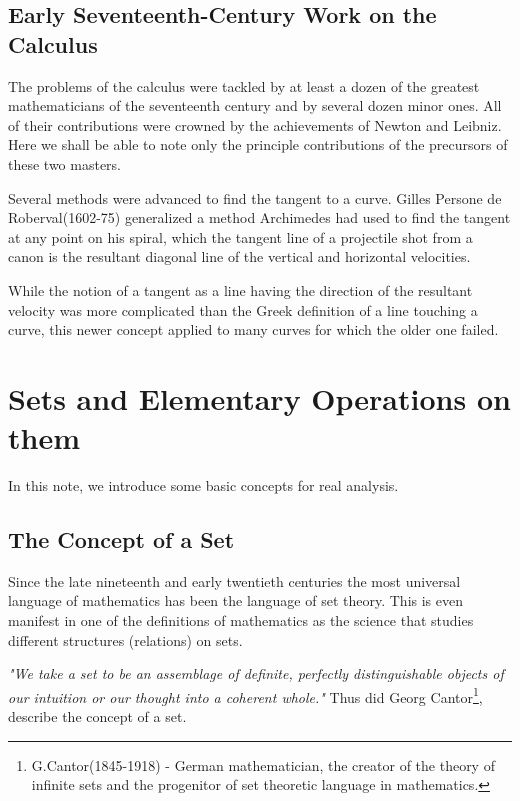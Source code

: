 \documentclass[a4paper,12pt]{article} %
\begin{document}
\subsection{Early Seventeenth-Century Work on the Calculus}

The problems of the calculus were tackled by at least a dozen 
of the greatest mathematicians of the seventeenth century and 
by several dozen minor ones. All of their contributions were 
crowned by the achievements of Newton and Leibniz. Here we shall 
be able to note only the principle contributions of the precursors 
of these two masters.

Several methods were advanced to find the tangent to a curve.
Gilles Persone de Roberval(1602-75) generalized a method Archimedes 
had used to find the tangent at any point on his spiral, which 
the tangent line of a projectile shot from a canon is the resultant 
diagonal line of the vertical and horizontal velocities.

While the notion of a tangent as a line having the direction of the 
resultant velocity was more complicated than the Greek definition 
of a line touching a curve, this newer concept applied to many 
curves for which the older one failed.


















\section{Sets and Elementary Operations on them}

In this note, we introduce some basic concepts for real 
analysis.

\subsection{The Concept of a Set}
Since the late nineteenth and early twentieth centuries 
the most universal language of mathematics has been the 
language of set theory. This is even manifest in one of 
the definitions of mathematics as the science that 
studies different structures (relations) on sets.

\emph{"We take a set to be an assemblage of definite, 
perfectly distinguishable objects of our intuition or 
our thought into a coherent whole."} Thus did Georg 
Cantor\footnote{G.Cantor(1845-1918) - German 
mathematician, the creator of the theory of infinite 
sets and the progenitor of set theoretic language in 
mathematics.}, describe the concept of a set.
\end{document}
